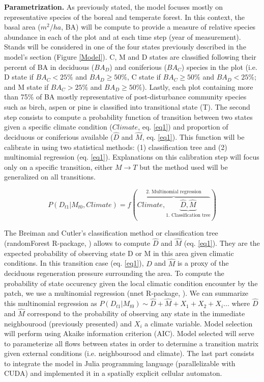 \textbf{Parametrization.} As previously stated, the model focuses mostly on
representative species of the boreal and temperate forest. In this context,
the basal area ($m^2/ha$, BA) will be compute to provide a measure of relative
species abundance in each of the plot and at each time step (year of
measurement). Stands will be considered in one of the four states previously
described in the model's section (Figure \ref{Model}). C, M and D states are
classified following their percent of BA in deciduous ($BA_D$) and coniferious
($BA_C$) species in the plot (i.e. D state if $BA_C < 25\%$ and $BA_D \geq
50\%$, C state if ${BA}_C \geq 50\%$ and $BA_D < 25\%$; and M state if $BA_C >
25\%$ and $BA_D \geq 50\%$). Lastly, each plot containing more than 75\% of BA
mostly representative of post-disturbance community species such as birch,
aspen or pine is classified into transitional state (T). The second step
consists to compute a probability function of transition between two states
given a specific climate condition ($Climate$, eq. \ref{eq1}) and proportion
of deciduous or coniferious available ($\hat{D}$ and $\hat{M}$, eq.
\ref{eq1}). This function will be calibrate in using two statistical methods:
(1) classification tree and (2) multinomial regression (eq. \ref{eq1}).
Explanations on this calibration step will focus only on a specific
transition, either $M \rightarrow T$ but the method used will be generalized
on all transitions.

\vspace{-1em}
\begin{equation}
	P(D_{t1}|M_{t0}, Climate) = f(\overbrace{Climate, \underbrace{\hat{D}, \hat{M}}_\text{1. Classification tree}}^\text{2. Multinomial regression})
\label{eq1}
\end{equation}

The Breiman and Cutler's classification method or classification tree
(randomForest R-package, \cite{Liaw2002a}) allows to compute $\hat{D}$ and
$\hat{M}$ (eq. \ref{eq1}). They are the expected probability of observing
state D or M in this area given climatic conditions. In this transition case
(eq. \ref{eq1}), $\hat{D}$ and $\hat{M}$ is a proxy of the deciduous
regeneration pressure surrounding the area. To compute the probability of
state occurency given the local climatic condition encounter by the patch, we
use a multinomial regression (nnet R-package, \cite{Venables2002}). We can
summarize this multinomial regression as $P(D_{t1}|M_{t0}) \sim \hat{D} +
\hat{M} + X_1+X_2+X_i... $ where $\hat{D}$ and $\hat{M}$ correspond to the
probability of observing any state in the immediate neighbourood (previously
presented) and $X_i$ a climate variable. Model selection will perform using
Akaike information criterion (AIC). Model selected will serve to parameterize
all flows between states in order to determine a transition matrix given
external conditions (i.e. neighbourood and climate). The last part consists to
integrate the model in Julia programming language (parallelizable with CUDA)
and implemented it in a spatially explicit cellular automaton.\\

